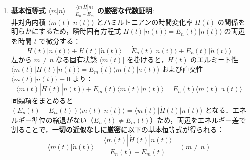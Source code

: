 \documentclass[11pt,a4paper,oneside,openany]{ltjsbook}
\theoremstyle{definition}
\theoremstyle{plain}
\theoremstyle{remark}
\newcommand{\ket}[1]{|#1\rangle}
\newcommand{\bra}[1]{\langle#1|}
\newcommand{\braket}[2]{\langle#1|#2\rangle}
\newcommand{\mel}[3]{\langle#1|#2|#3\rangle}
\begin{document}
\begin{insightbox}
\begin{enumerate}[label=\textbf{Step \arabic* :}, leftmargin=*]
    \item \textbf{基本恒等式 $\braket{m}{\dot{n}} = \frac{\mel{m}{\dot{H}}{n}}{E_n - E_m}$ の厳密な代数証明}:\\
    非対角内積 $\braket{m(t)}{\dot{n}(t)}$ とハミルトニアンの時間変化率 $\dot{H}(t)$ の関係を明らかにするため，瞬時固有方程式 $H(t)\ket{n(t)} = E_n(t)\ket{n(t)}$ の両辺を時間 $t$ で微分する：
    \begin{equation}
        \dot{H}(t)\ket{n(t)} + H(t)\ket{\dot{n}(t)} = \dot{E}_n(t)\ket{n(t)} + E_n(t)\ket{\dot{n}(t)}
    \end{equation}
    左から $m \neq n$ なる固有状態 $\bra{m(t)}$ を掛けると，$H(t)$ のエルミート性 $\mel{m(t)}{H(t)}{\dot{n}(t)} = E_m(t)\braket{m(t)}{\dot{n}(t)}$ および直交性 $\braket{m(t)}{n(t)}=0$ より：
    \begin{equation}
        \mel{m(t)}{\dot{H}(t)}{n(t)} + E_m(t)\braket{m(t)}{\dot{n}(t)} = E_n(t)\braket{m(t)}{\dot{n}(t)}
    \end{equation}
    同類項をまとめると $(E_n(t) - E_m(t))\braket{m(t)}{\dot{n}(t)} = \mel{m(t)}{\dot{H}(t)}{n(t)}$ となる．エネルギー準位の縮退がない（$E_n(t) \neq E_m(t)$）ため，両辺をエネルギー差で割ることで，\textbf{一切の近似なしに厳密に}以下の基本恒等式が得られる：
    \begin{equation}
        \braket{m(t)}{\dot{n}(t)} = \frac{\mel{m(t)}{\dot{H}(t)}{n(t)}}{E_n(t) - E_m(t)} \quad (m \neq n)
    \end{equation}


\end{enumerate}
\end{insightbox}
\end{document}
